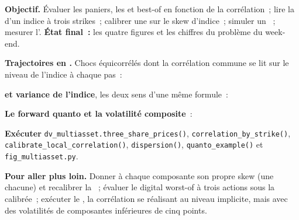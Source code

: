 \begin{tutorial}
\textbf{Objectif.} Évaluer les paniers, les  et best-of en fonction de la corrélation~; lire la  d'un indice à trois
strikes~; calibrer une  sur le skew d'indice~; simuler un ~; mesurer l'.
\textbf{État final~:} les quatre figures et les chiffres du problème du week-end.
\begin{tutsteps}
\item \textbf{Trajectoires en .} Chocs équicorrélés dont la corrélation commune se lit sur le niveau de l'indice à chaque
pas~:
\label{lst:dv:multi-asset-options:lc}
\item \textbf{ et variance de l'indice}, les deux sens d'une même formule~:
\label{lst:dv:multi-asset-options:implied}
\item \textbf{Le forward quanto et la volatilité composite}~:
\label{lst:dv:multi-asset-options:quanto}
\item \textbf{Exécuter} \texttt{dv\_multiasset.three\_share\_prices()}, \texttt{correlation\_by\_strike()},
\texttt{calibrate\_local\_correlation()}, \texttt{dispersion()}, \texttt{quanto\_example()} et \texttt{fig\_multiasset.py}.
\end{tutsteps}
\textbf{Pour aller plus loin.} Donner à chaque composante son propre skew (une  chacune) et recalibrer la ~;
évaluer le digital worst-of à trois actions sous la  calibrée~; exécuter le , la corrélation
se réalisant au niveau implicite, mais avec des volatilités de composantes inférieures de cinq points.
\end{tutorial}

